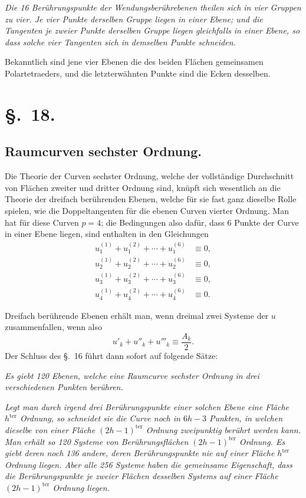 \documentclass{article}
\begin{document}
\emph{Die 16 Berührungspunkte der Wendungsberührebenen theilen sich in vier Gruppen zu vier. Je vier Punkte derselben Gruppe liegen in einer Ebene; und die Tangenten je zweier Punkte derselben Gruppe liegen gleichfalls in einer Ebene, so dass solche vier Tangenten sich in demselben Punkte schneiden.}

Bekanntlich sind jene vier Ebenen die des beiden Flächen gemeinsamen Polartetraeders, und die letzterwähnten Punkte sind die Ecken desselben.

\section*{§.~18.}
\subsection*{Raumcurven sechster Ordnung.}

Die Theorie der Curven sechster Ordnung, welche der vollständige Durchschnitt von Flächen zweiter und dritter Ordnung sind, knüpft sich wesentlich an die Theorie der dreifach berührenden Ebenen, welche für sie fast ganz dieselbe Rolle spielen, wie die Doppeltangenten für die ebenen Curven vierter Ordnung. Man hat für diese Curven $p=4$; die Bedingungen also dafür, dass 6 Punkte der Curve in einer Ebene liegen, sind enthalten in den Gleichungen
\[
\begin{aligned}
u_{1}^{(1)}+u_{1}^{(2)}+\cdots+u_{1}^{(6)} &\equiv 0,\\
u_{2}^{(1)}+u_{2}^{(2)}+\cdots+u_{2}^{(6)} &\equiv 0,\\
u_{3}^{(1)}+u_{3}^{(2)}+\cdots+u_{3}^{(6)} &\equiv 0,\\
u_{4}^{(1)}+u_{4}^{(2)}+\cdots+u_{4}^{(6)} &\equiv 0.
\end{aligned}
\]

Dreifach berührende Ebenen erhält man, wenn dreimal zwei Systeme der $u$ zusammenfallen, wenn also
\[
u'_{k}+u''_{k}+u'''_{k} \equiv \frac{A_{k}}{2}.
\]
Der Schluss des §.~16 führt dann sofort auf folgende Sätze:

\emph{Es giebt 120 Ebenen, welche eine Raumcurve sechster Ordnung in drei verschiedenen Punkten berühren.}

\emph{Legt man durch irgend drei Berührungspunkte einer solchen Ebene eine Fläche $h^{\text{ter}}$ Ordnung, so schneidet sie die Curve noch in $6h-3$ Punkten, in welchen dieselbe von einer Fläche $(2h-1)^{\text{ter}}$ Ordnung zweipunktig berührt werden kann. Man erhält so 120 Systeme von Berührungsflächen $(2h-1)^{\text{ter}}$ Ordnung. Es giebt deren noch 136 andere, deren Berührungspunkte nie auf einer Fläche $h^{\text{ter}}$ Ordnung liegen. Aber alle 256 Systeme haben die gemeinsame Eigenschaft, dass die Berührungspunkte je zweier Flächen desselben Systems auf einer Fläche $(2h-1)^{\text{ter}}$ Ordnung liegen.}
\end{document}
